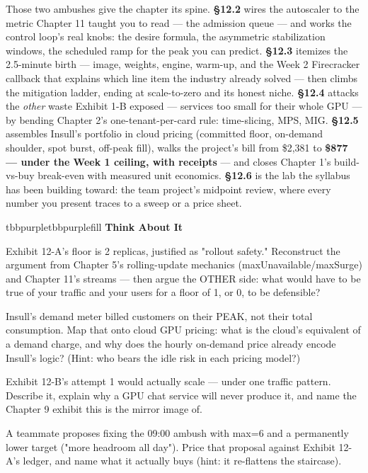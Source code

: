 Those two ambushes give the chapter its spine. \textbf{§12.2} wires the autoscaler to the metric Chapter 11 taught you to read — the admission queue — and works the control loop's real knobs: the desire formula, the asymmetric stabilization windows, the scheduled ramp for the peak you can predict. \textbf{§12.3} itemizes the 2.5-minute birth — image, weights, engine, warm-up, and the Week 2 Firecracker callback that explains which line item the industry already solved — then climbs the mitigation ladder, ending at scale-to-zero and its honest niche. \textbf{§12.4} attacks the \textit{other} waste Exhibit 1-B exposed — services too small for their whole GPU — by bending Chapter 2's one-tenant-per-card rule: time-slicing, MPS, MIG. \textbf{§12.5} assembles Insull's portfolio in cloud pricing (committed floor, on-demand shoulder, spot burst, off-peak fill), walks the project's bill from \$2,381 to \textbf{\$877 — under the Week 1 ceiling, with receipts} — and closes Chapter 1's build-vs-buy break-even with measured unit economics. \textbf{§12.6} is the lab the syllabus has been building toward: the team project's midpoint review, where every number you present traces to a sweep or a price sheet.

\begin{calloutbox}{tbbpurple}{tbbpurplefill}
{\normalsize\bfseries\color{tbbpurple}Think About It}\par\vspace{3pt}
\begin{tbbitemize}
  \item Exhibit 12-A's floor is 2 replicas, justified as "rollout safety." Reconstruct the argument from Chapter 5's rolling-update mechanics (maxUnavailable/maxSurge) and Chapter 11's streams — then argue the OTHER side: what would have to be true of your traffic and your users for a floor of 1, or 0, to be defensible?
  \item Insull's demand meter billed customers on their PEAK, not their total consumption. Map that onto cloud GPU pricing: what is the cloud's equivalent of a demand charge, and why does the hourly on-demand price already encode Insull's logic? (Hint: who bears the idle risk in each pricing model?)
  \item Exhibit 12-B's attempt 1 would actually scale — under one traffic pattern. Describe it, explain why a GPU chat service will never produce it, and name the Chapter 9 exhibit this is the mirror image of.
  \item A teammate proposes fixing the 09:00 ambush with max=6 and a permanently lower target ("more headroom all day"). Price that proposal against Exhibit 12-A's ledger, and name what it actually buys (hint: it re-flattens the staircase).
\end{tbbitemize}
\end{calloutbox}

